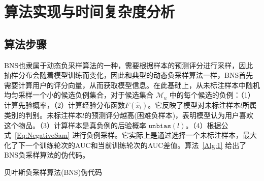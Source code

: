 \section{算法实现与时间复杂度分析}
\subsection{算法步骤}
BNS也隶属于动态负采样算法的一种，需要根据样本的预测评分进行采样，因此抽样分布会随着模型训练而变化，因此和典型的动态负采样算法一样，BNS首先需要计算用户的评分向量，从而获取模型信息。在此基础上，从未标注样本中随机均匀采样一个小的候选负例集合，对于候选集合 $\mathcal{M}_u$ 中的每个候选的负例：（1）计算先验概率，（2）计算经验分布函数$F(\hat{x}_l)$。它反映了模型对未标注样本$l$所属类别的判别。未标注样本$l$的预测评分越高(困难负样本)，表明模型认为用户喜欢这个物品。（3）计算样本是真负例的后验概率 $\mathtt{unbias}(l)$。（4）根据公式~\eqref{Eq:NegativeSam} 进行负例采样。它实际上是通过选择一个未标注样本，最大化了下一个训练轮次的AUC和当前训练轮次的AUC差值。算法~\ref{Alg:1} 给出了BNS负采样算法的伪代码。
\begin{algorithm}[!]
	\SetAlgoLined
	\small
	\caption{贝叶斯负采样算法(BNS)伪代码}\label{Alg:1}
\end{algorithm}

